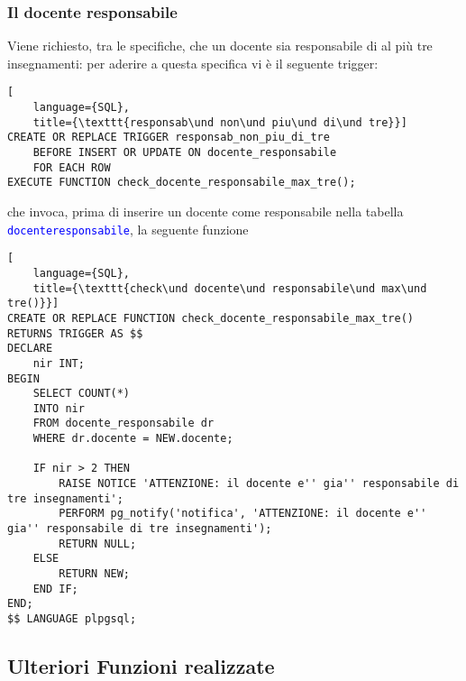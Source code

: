 \documentclass{article}
\newcommand{\tabb}[1]{\texttt{\textcolor{blue}{#1}}}
\newcommand{\und}[0]{\textunderscore}
\begin{document}
\subsubsection{Il docente responsabile}
Viene richiesto, tra le specifiche, che un docente sia responsabile di al più tre insegnamenti: per aderire a questa specifica vi è il seguente trigger:

\begin{lstlisting}[
    language={SQL},
    title={\texttt{responsab\und non\und piu\und di\und tre}}]
CREATE OR REPLACE TRIGGER responsab_non_piu_di_tre
    BEFORE INSERT OR UPDATE ON docente_responsabile
    FOR EACH ROW
EXECUTE FUNCTION check_docente_responsabile_max_tre();
\end{lstlisting}

che invoca, prima di inserire un docente come responsabile nella tabella \tabb{docente\und responsabile}, la seguente funzione

\begin{lstlisting}[
    language={SQL},
    title={\texttt{check\und docente\und responsabile\und max\und tre()}}]
CREATE OR REPLACE FUNCTION check_docente_responsabile_max_tre() RETURNS TRIGGER AS $$
DECLARE
    nir INT;
BEGIN
    SELECT COUNT(*)
    INTO nir
    FROM docente_responsabile dr
    WHERE dr.docente = NEW.docente;

    IF nir > 2 THEN
        RAISE NOTICE 'ATTENZIONE: il docente e'' gia'' responsabile di tre insegnamenti';
        PERFORM pg_notify('notifica', 'ATTENZIONE: il docente e'' gia'' responsabile di tre insegnamenti');
        RETURN NULL;
    ELSE
        RETURN NEW;
    END IF;
END;
$$ LANGUAGE plpgsql;
\end{lstlisting}

\subsection{Ulteriori Funzioni realizzate}
\end{document}
